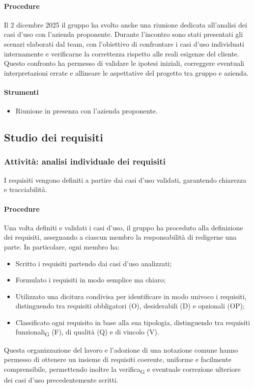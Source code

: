 \documentclass[11pt,a4paper]{article}
\newcommand{\gls}[1]{#1\textsubscript{G}}
\begin{document}
\paragraph{Procedure}
Il 2 dicembre 2025 il gruppo ha svolto anche una riunione dedicata all'analisi dei casi d'uso con l’azienda proponente. Durante l’incontro sono stati presentati gli scenari elaborati dal team, con l’obiettivo di confrontare i casi d’uso individuati internamente e verificarne la correttezza rispetto alle reali esigenze del cliente. Questo confronto ha permesso di validare le ipotesi iniziali, correggere eventuali interpretazioni errate e allineare le aspettative del progetto tra gruppo e azienda.

\paragraph{Strumenti}
\begin{itemize}
\item Riunione in presenza con l'azienda proponente.
\end{itemize}

\subsection{Studio dei requisiti}

\subsubsection{Attività: analisi individuale dei requisiti}
I requisiti vengono definiti a partire dai casi d’uso validati, garantendo chiarezza e tracciabilità.

\paragraph{Procedure}
Una volta definiti e validati i casi d’uso, il gruppo ha proceduto alla definizione dei requisiti, assegnando a ciascun membro la responsabilità di redigerne una parte. In particolare, ogni membro ha:
\begin{itemize}
\item Scritto i requisiti partendo dai casi d’uso analizzati;
\item Formulato i requisiti in modo semplice ma chiaro;
\item Utilizzato una dicitura condivisa per identificare in modo univoco i requisiti, distinguendo tra requisiti obbligatori (O), desiderabili (D) e opzionali (OP);
\item Classificato ogni requisito in base alla sua tipologia, distinguendo tra \gls{requisiti funzionali} (F), di qualità (Q) e di vincolo (V).
\end{itemize}
Questa organizzazione del lavoro e l’adozione di una notazione comune hanno permesso di ottenere un insieme di requisiti coerente, uniforme e facilmente comprensibile, permettendo inoltre la \gls{verifica} e eventuale correzione ulteriore dei casi d’uso precedentemente scritti.
\end{document}
